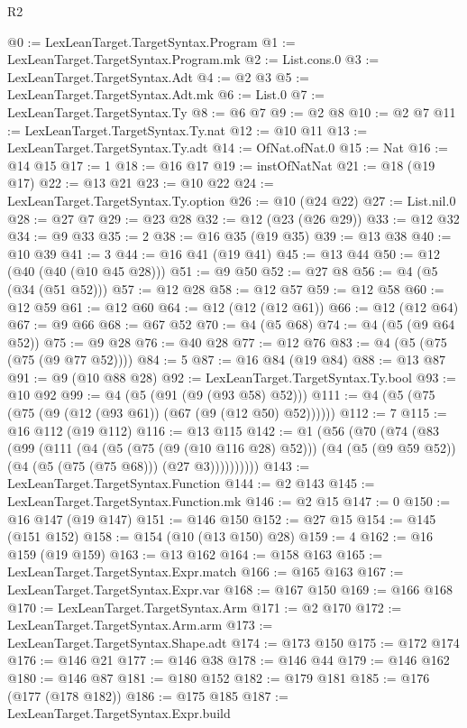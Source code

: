\begin{lexlean}{R2}
\begin{coremodule}
@0 := LexLeanTarget.TargetSyntax.Program
@1 := LexLeanTarget.TargetSyntax.Program.mk
@2 := List.cons.{0}
@3 := LexLeanTarget.TargetSyntax.Adt
@4 := @2 @3
@5 := LexLeanTarget.TargetSyntax.Adt.mk
@6 := List.{0}
@7 := LexLeanTarget.TargetSyntax.Ty
@8 := @6 @7
@9 := @2 @8
@10 := @2 @7
@11 := LexLeanTarget.TargetSyntax.Ty.nat
@12 := @10 @11
@13 := LexLeanTarget.TargetSyntax.Ty.adt
@14 := OfNat.ofNat.{0}
@15 := Nat
@16 := @14 @15
@17 := 1
@18 := @16 @17
@19 := instOfNatNat
@21 := @18 (@19 @17)
@22 := @13 @21
@23 := @10 @22
@24 := LexLeanTarget.TargetSyntax.Ty.option
@26 := @10 (@24 @22)
@27 := List.nil.{0}
@28 := @27 @7
@29 := @23 @28
@32 := @12 (@23 (@26 @29))
@33 := @12 @32
@34 := @9 @33
@35 := 2
@38 := @16 @35 (@19 @35)
@39 := @13 @38
@40 := @10 @39
@41 := 3
@44 := @16 @41 (@19 @41)
@45 := @13 @44
@50 := @12 (@40 (@40 (@10 @45 @28)))
@51 := @9 @50
@52 := @27 @8
@56 := @4 (@5 (@34 (@51 @52)))
@57 := @12 @28
@58 := @12 @57
@59 := @12 @58
@60 := @12 @59
@61 := @12 @60
@64 := @12 (@12 (@12 @61))
@66 := @12 (@12 @64)
@67 := @9 @66
@68 := @67 @52
@70 := @4 (@5 @68)
@74 := @4 (@5 (@9 @64 @52))
@75 := @9 @28
@76 := @40 @28
@77 := @12 @76
@83 := @4 (@5 (@75 (@75 (@9 @77 @52))))
@84 := 5
@87 := @16 @84 (@19 @84)
@88 := @13 @87
@91 := @9 (@10 @88 @28)
@92 := LexLeanTarget.TargetSyntax.Ty.bool
@93 := @10 @92
@99 := @4 (@5 (@91 (@9 (@93 @58) @52)))
@111 := @4 (@5 (@75 (@75 (@9 (@12 (@93 @61)) (@67 (@9 (@12 @50) @52))))))
@112 := 7
@115 := @16 @112 (@19 @112)
@116 := @13 @115
@142 := @1
    (@56
      (@70
        (@74
          (@83
            (@99
              (@111
                (@4
                  (@5 (@75 (@9 (@10 @116 @28) @52)))
                  (@4 (@5 (@9 @59 @52)) (@4 (@5 (@75 (@75 @68))) (@27 @3))))))))))
@143 := LexLeanTarget.TargetSyntax.Function
@144 := @2 @143
@145 := LexLeanTarget.TargetSyntax.Function.mk
@146 := @2 @15
@147 := 0
@150 := @16 @147 (@19 @147)
@151 := @146 @150
@152 := @27 @15
@154 := @145 (@151 @152)
@158 := @154 (@10 (@13 @150) @28)
@159 := 4
@162 := @16 @159 (@19 @159)
@163 := @13 @162
@164 := @158 @163
@165 := LexLeanTarget.TargetSyntax.Expr.match
@166 := @165 @163
@167 := LexLeanTarget.TargetSyntax.Expr.var
@168 := @167 @150
@169 := @166 @168
@170 := LexLeanTarget.TargetSyntax.Arm
@171 := @2 @170
@172 := LexLeanTarget.TargetSyntax.Arm.arm
@173 := LexLeanTarget.TargetSyntax.Shape.adt
@174 := @173 @150
@175 := @172 @174
@176 := @146 @21
@177 := @146 @38
@178 := @146 @44
@179 := @146 @162
@180 := @146 @87
@181 := @180 @152
@182 := @179 @181
@185 := @176 (@177 (@178 @182))
@186 := @175 @185
@187 := LexLeanTarget.TargetSyntax.Expr.build

\end{coremodule}
\end{lexlean}
